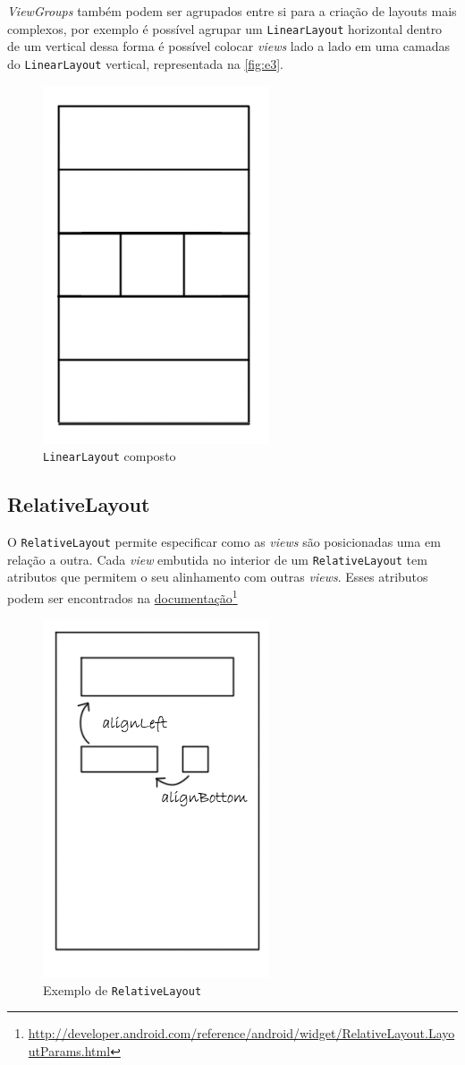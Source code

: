 \documentclass[a4paper,12pt,brazil,oneside]{book}
\begin{document}
\begin{singlespace}
\emph{ViewGroups} também podem ser agrupados entre si para a criação de layouts mais complexos, por exemplo é possível agrupar um \texttt{LinearLayout} horizontal dentro de um vertical dessa forma é possível colocar \emph{views} lado a lado em uma camadas do \texttt{LinearLayout} vertical, representada na \autoref{fig:e3}.

\begin{figure}[H]
  \centering
  \includegraphics[width=.25\textwidth]{figuras/design/linearlayout-composto.jpg}
  \caption{\texttt{LinearLayout} composto}
  \label{fig:e4}
\end{figure}

\subsection{RelativeLayout}
\label{subsec:relativelayout}

O \texttt{RelativeLayout} permite especificar como as \emph{views} são posicionadas uma em relação a outra. Cada \emph{view} embutida no interior de um \texttt{RelativeLayout} tem atributos que permitem o seu alinhamento com outras \emph{views}. Esses atributos podem ser encontrados na \href{http://developer.android.com/reference/android/widget/RelativeLayout.LayoutParams.html}{documentação}\footnote{ \href{http://developer.android.com/reference/android/widget/RelativeLayout.LayoutParams.html}{http://developer.android.com/reference/android/widget/RelativeLayout.LayoutParams.html}}

\begin{figure}[H]
  \centering
  \includegraphics[width=.25\textwidth]{figuras/design/relativelayout.jpg}
  \caption{Exemplo de \texttt{RelativeLayout}}
  \label{fig:e5}
\end{figure}


\end{singlespace}
\end{document}
